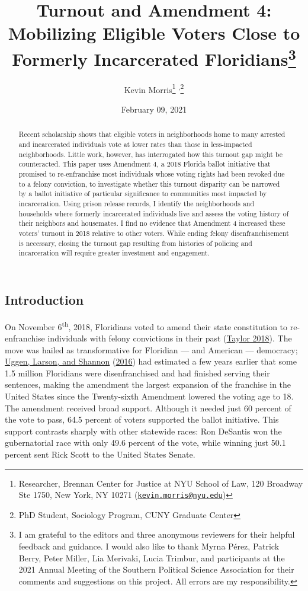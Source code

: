 \documentclass[
  12pt,
]{article}
\title{Turnout and Amendment 4: Mobilizing Eligible Voters Close to Formerly Incarcerated Floridians\thanks{I am grateful to the editors and three anonymous reviewers for their helpful feedback and guidance. I would also like to thank Myrna Pérez, Patrick Berry, Peter Miller, Lia Merivaki, Lucia Trimbur, and participants at the 2021 Annual Meeting of the Southern Political Science Association for their comments and suggestions on this project. All errors are my responsibility.}}
\author{Kevin Morris\footnote{Researcher, Brennan Center for Justice at NYU School of Law, 120 Broadway Ste 1750, New York, NY 10271 (\href{mailto:kevin.morris@nyu.edu}{\nolinkurl{kevin.morris@nyu.edu}})} \textsuperscript{,}\footnote{PhD Student, Sociology Program, CUNY Graduate Center}}
\date{February 09, 2021}
\begin{document}
\maketitle
\begin{abstract}
Recent scholarship shows that eligible voters in neighborhoods home to many arrested and incarcerated individuals vote at lower rates than those in less-impacted neighborhoods. Little work, however, has interrogated how this turnout gap might be counteracted. This paper uses Amendment 4, a 2018 Florida ballot initiative that promised to re-enfranchise most individuals whose voting rights had been revoked due to a felony conviction, to investigate whether this turnout disparity can be narrowed by a ballot initiative of particular significance to communities most impacted by incarceration. Using prison release records, I identify the neighborhoods and households where formerly incarcerated individuals live and assess the voting history of their neighbors and housemates. I find no evidence that Amendment 4 increased these voters' turnout in 2018 relative to other voters. While ending felony disenfranchisement is necessary, closing the turnout gap resulting from histories of policing and incarceration will require greater investment and engagement.
\end{abstract}

\pagebreak

\doublespacing

\hypertarget{introduction}{%
\subsection*{Introduction}\label{introduction}}

On November 6\textsuperscript{th}, 2018, Floridians voted to amend their state constitution to re-enfranchise individuals with felony convictions in their past (\protect\hyperlink{ref-Taylor2018}{Taylor 2018}). The move was hailed as transformative for Floridian --- and American --- democracy; \protect\hyperlink{ref-sentencing_2016}{Uggen, Larson, and Shannon} (\protect\hyperlink{ref-sentencing_2016}{2016}) had estimated a few years earlier that some 1.5 million Floridians were disenfranchised and had finished serving their sentences, making the amendment the largest expansion of the franchise in the United States since the Twenty-sixth Amendment lowered the voting age to 18. The amendment received broad support. Although it needed just 60 percent of the vote to pass, 64.5 percent of voters supported the ballot initiative. This support contrasts sharply with other statewide races: Ron DeSantis won the gubernatorial race with only 49.6 percent of the vote, while winning just 50.1 percent sent Rick Scott to the United States Senate.
\end{document}
